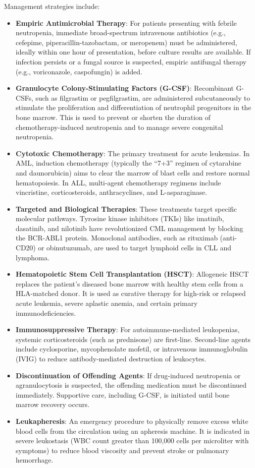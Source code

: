 Management strategies include:
\begin{itemize}
  \item \textbf{Empiric Antimicrobial Therapy}: For patients presenting with febrile neutropenia, immediate broad-spectrum intravenous antibiotics (e.g., cefepime, piperacillin-tazobactam, or meropenem) must be administered, ideally within one hour of presentation, before culture results are available. If infection persists or a fungal source is suspected, empiric antifungal therapy (e.g., voriconazole, caspofungin) is added.
  \item \textbf{Granulocyte Colony-Stimulating Factors (G-CSF)}: Recombinant G-CSFs, such as filgrastim or pegfilgrastim, are administered subcutaneously to stimulate the proliferation and differentiation of neutrophil progenitors in the bone marrow. This is used to prevent or shorten the duration of chemotherapy-induced neutropenia and to manage severe congenital neutropenia.
  \item \textbf{Cytotoxic Chemotherapy}: The primary treatment for acute leukemias. In AML, induction chemotherapy (typically the ``7+3'' regimen of cytarabine and daunorubicin) aims to clear the marrow of blast cells and restore normal hematopoiesis. In ALL, multi-agent chemotherapy regimens include vincristine, corticosteroids, anthracyclines, and L-asparaginase.
  \item \textbf{Targeted and Biological Therapies}: These treatments target specific molecular pathways. Tyrosine kinase inhibitors (TKIs) like imatinib, dasatinib, and nilotinib have revolutionized CML management by blocking the BCR-ABL1 protein. Monoclonal antibodies, such as rituximab (anti-CD20) or obinutuzumab, are used to target lymphoid cells in CLL and lymphoma.
  \item \textbf{Hematopoietic Stem Cell Transplantation (HSCT)}: Allogeneic HSCT replaces the patient's diseased bone marrow with healthy stem cells from a HLA-matched donor. It is used as curative therapy for high-risk or relapsed acute leukemia, severe aplastic anemia, and certain primary immunodeficiencies.
  \item \textbf{Immunosuppressive Therapy}: For autoimmune-mediated leukopenias, systemic corticosteroids (such as prednisone) are first-line. Second-line agents include cyclosporine, mycophenolate mofetil, or intravenous immunoglobulin (IVIG) to reduce antibody-mediated destruction of leukocytes.
  \item \textbf{Discontinuation of Offending Agents}: If drug-induced neutropenia or agranulocytosis is suspected, the offending medication must be discontinued immediately. Supportive care, including G-CSF, is initiated until bone marrow recovery occurs.
  \item \textbf{Leukapheresis}: An emergency procedure to physically remove excess white blood cells from the circulation using an apheresis machine. It is indicated in severe leukostasis (WBC count greater than 100,000 cells per microliter with symptoms) to reduce blood viscosity and prevent stroke or pulmonary hemorrhage.
\end{itemize}

